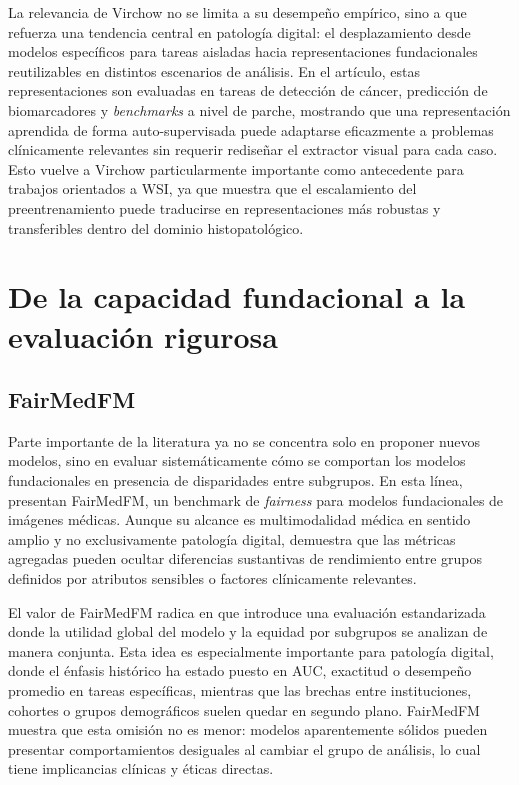La relevancia de Virchow no se limita a su desempeño empírico, sino a que refuerza una tendencia central en patología digital: el desplazamiento desde modelos específicos para tareas aisladas hacia representaciones fundacionales reutilizables en distintos escenarios de análisis. En el artículo, estas representaciones son evaluadas en tareas de detección de cáncer, predicción de biomarcadores y \textit{benchmarks} a nivel de parche, mostrando que una representación aprendida de forma auto-supervisada puede adaptarse eficazmente a problemas clínicamente relevantes sin requerir rediseñar el extractor visual para cada caso. Esto vuelve a Virchow particularmente importante como antecedente para trabajos orientados a WSI, ya que muestra que el escalamiento del preentrenamiento puede traducirse en representaciones más robustas y transferibles dentro del dominio histopatológico.

\section{De la capacidad fundacional a la evaluación rigurosa}

\subsection{FairMedFM}

Parte importante de la literatura ya no se concentra solo en proponer nuevos modelos, sino en evaluar sistemáticamente cómo se comportan los modelos fundacionales en presencia de disparidades entre subgrupos. En esta línea, \textcite{NEURIPS2024_c9826b9e} presentan FairMedFM, un benchmark de \textit{fairness} para modelos fundacionales de imágenes médicas. Aunque su alcance es multimodalidad médica en sentido amplio y no exclusivamente patología digital, demuestra que las métricas agregadas pueden ocultar diferencias sustantivas de rendimiento entre grupos definidos por atributos sensibles o factores clínicamente relevantes.

El valor de FairMedFM radica en que introduce una evaluación estandarizada donde la utilidad global del modelo y la equidad por subgrupos se analizan de manera conjunta. Esta idea es especialmente importante para patología digital, donde el énfasis histórico ha estado puesto en AUC, exactitud o desempeño promedio en tareas específicas, mientras que las brechas entre instituciones, cohortes o grupos demográficos suelen quedar en segundo plano. FairMedFM muestra que esta omisión no es menor: modelos aparentemente sólidos pueden presentar comportamientos desiguales al cambiar el grupo de análisis, lo cual tiene implicancias clínicas y éticas directas.

